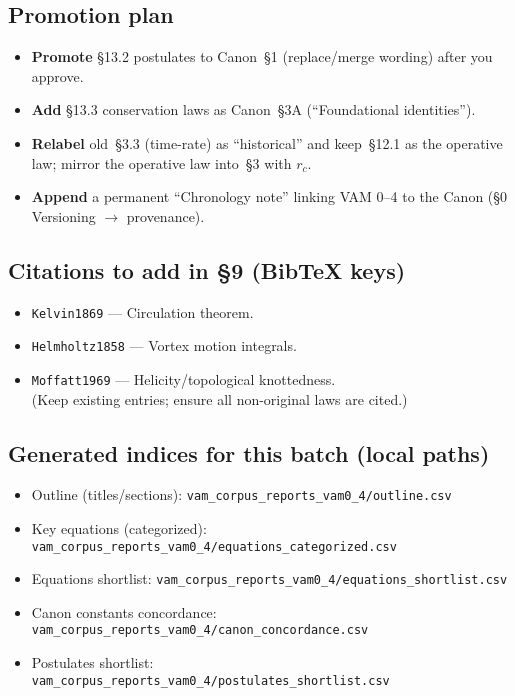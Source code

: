 \documentclass[11pt]{article}
\begin{document}
    \subsection{Promotion plan}
    \begin{itemize}
        \item \textbf{Promote} \S13.2 postulates to Canon~\S1 (replace/merge wording) after you approve.
        \item \textbf{Add} \S13.3 conservation laws as Canon~\S3A (``Foundational identities'').
        \item \textbf{Relabel} old~\S3.3 (time-rate) as ``historical'' and keep~\S12.1 as the operative law; mirror the operative law into~\S3 with $r_c$.
        \item \textbf{Append} a permanent ``Chronology note'' linking VAM 0--4 to the Canon (\S0 Versioning $\rightarrow$ provenance).
    \end{itemize}

    \subsection{Citations to add in \S9 (BibTeX keys)}
    \begin{itemize}
        \item \texttt{Kelvin1869} --- Circulation theorem.
        \item \texttt{Helmholtz1858} --- Vortex motion integrals.
        \item \texttt{Moffatt1969} --- Helicity/topological knottedness.\\
        (Keep existing entries; ensure all non-original laws are cited.)
    \end{itemize}

    \subsection{Generated indices for this batch (local paths)}
    \begin{itemize}
        \item Outline (titles/sections): \texttt{vam\_corpus\_reports\_vam0\_4/outline.csv}
        \item Key equations (categorized): \texttt{vam\_corpus\_reports\_vam0\_4/equations\_categorized.csv}
        \item Equations shortlist: \texttt{vam\_corpus\_reports\_vam0\_4/equations\_shortlist.csv}
        \item Canon constants concordance: \texttt{vam\_corpus\_reports\_vam0\_4/canon\_concordance.csv}
        \item Postulates shortlist: \texttt{vam\_corpus\_reports\_vam0\_4/postulates\_shortlist.csv}
    \end{itemize}
\end{document}
